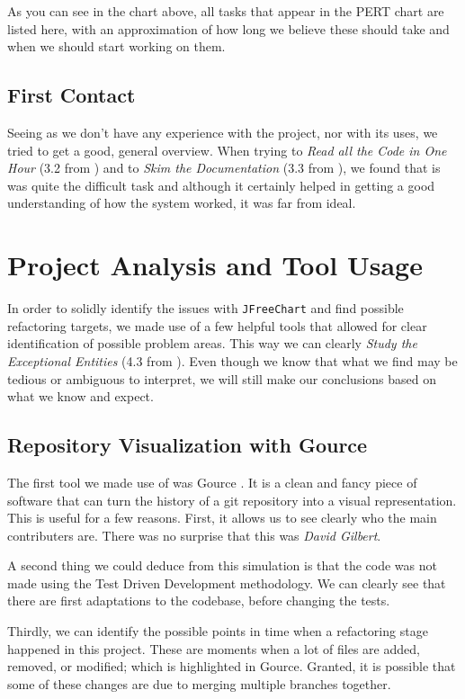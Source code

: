 \documentclass[11pt]{article}
\begin{document}
	As you can see in the chart above, all tasks that appear in the \textsf{PERT} chart are listed here, with an approximation of how long we believe these should take and when we should start working on them.
   
	
	\subsection{First Contact}
	Seeing as we don't have any experience with the project, nor with its uses, we tried to get a good, general overview. When trying to \textsl{Read all the Code in One Hour} (3.2 from \cite{demeyer2009object}) and to \textsl{Skim the Documentation} (3.3 from \cite{demeyer2009object}), we found that is was quite the difficult task and although it certainly helped in getting a good understanding of how the system worked, it was far from ideal.
	
	
	\section{Project Analysis and Tool Usage}
	In order to solidly identify the issues with \texttt{JFreeChart} and find possible refactoring targets, we made use of a few helpful tools that allowed for clear identification of possible problem areas. This way we can clearly \textsl{Study the Exceptional Entities} (4.3 from \cite{demeyer2009object}). Even though we know that what we find may be tedious or ambiguous to interpret, we will still make our conclusions based on what we know and expect.
	
	\subsection{Repository Visualization with Gource}
	\label{sec:gource}
	The first tool we made use of was \textsf{Gource} \cite{gource}. It is a clean and fancy piece of software that can turn the history of a git repository into a visual representation. This is useful for a few reasons. First, it allows us to see clearly who the main contributers are. There was no surprise that this was \textsl{David Gilbert}.
	
	A second thing we could deduce from this simulation is that the code was not made using the \textsf{Test Driven Development} methodology. We can clearly see that there are first adaptations to the codebase, before changing the tests.
	
	Thirdly, we can identify the possible points in time when a refactoring stage happened in this project. These are moments when a lot of files are added, removed, or modified; which is highlighted in \textsf{Gource}. Granted, it is possible that some of these changes are due to merging multiple branches together.
	
\end{document}
